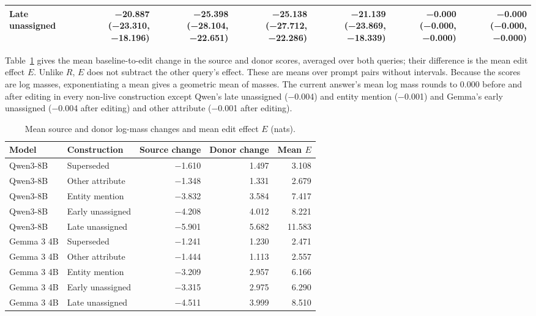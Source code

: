 \begin{table}[h]
\begin{center}
{\begin{tabular}{@{}lrrrrrr@{}}
Late unassigned & \shortstack[r]{−20.887\\[-1pt]\scriptsize(−23.310, −18.196)} & \shortstack[r]{−25.398\\[-1pt]\scriptsize(−28.104, −22.651)} & \shortstack[r]{−25.138\\[-1pt]\scriptsize(−27.712, −22.286)} & \shortstack[r]{−21.139\\[-1pt]\scriptsize(−23.869, −18.339)} & \shortstack[r]{−0.000\\[-1pt]\scriptsize(−0.000, −0.000)} & \shortstack[r]{−0.000\\[-1pt]\scriptsize(−0.000, −0.000)} \\
\bottomrule
\end{tabular}}
\end{center}
\end{table}

Table~\ref{tab:b-score-changes} gives the mean baseline-to-edit change in the source and donor scores, averaged over both queries; their difference is the mean edit effect $E$. Unlike $R$, $E$ does not subtract the other query's effect. These are means over prompt pairs without intervals. Because the scores are log masses, exponentiating a mean gives a geometric mean of masses. The current answer's mean log mass rounds to 0.000 before and after editing in every non-live construction except Qwen's late unassigned (−0.004) and entity mention (−0.001) and Gemma's early unassigned (−0.004 after editing) and other attribute (−0.001 after editing).

\begin{table}[h]
\caption{Mean source and donor log-mass changes and mean edit effect $E$ (nats).}
\label{tab:b-score-changes}
\begin{center}
\small
\begin{tabular}{@{}llrrr@{}}
\toprule
Model & Construction & Source change & Donor change & Mean $E$ \\
\midrule
Qwen3-8B & Superseded & −1.610 & 1.497 & 3.108 \\
Qwen3-8B & Other attribute & −1.348 & 1.331 & 2.679 \\
Qwen3-8B & Entity mention & −3.832 & 3.584 & 7.417 \\
Qwen3-8B & Early unassigned & −4.208 & 4.012 & 8.221 \\
Qwen3-8B & Late unassigned & −5.901 & 5.682 & 11.583 \\
\midrule
Gemma 3 4B & Superseded & −1.241 & 1.230 & 2.471 \\
Gemma 3 4B & Other attribute & −1.444 & 1.113 & 2.557 \\
Gemma 3 4B & Entity mention & −3.209 & 2.957 & 6.166 \\
Gemma 3 4B & Early unassigned & −3.315 & 2.975 & 6.290 \\
Gemma 3 4B & Late unassigned & −4.511 & 3.999 & 8.510 \\
\bottomrule
\end{tabular}
\end{center}
\end{table}

